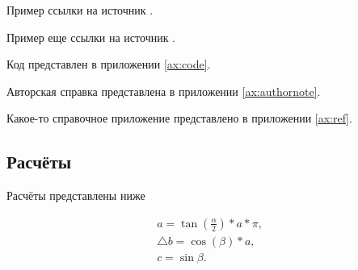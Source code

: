 Пример ссылки на источник .

Пример еще ссылки на источник .

Код представлен в приложении \ref{ax:code}.

Авторская справка представлена в приложении \ref{ax:authornote}.

Какое-то справочное приложение представлено в приложении \ref{ax:ref}.


\subsection{Расчёты}

Расчёты представлены ниже

\begin{gather}
	a = \tan(\frac{\alpha}{2})*a*\pi, \\
	\bigtriangleup b = \cos(\beta)*a, \\
	c = \sin{\beta}.
\end{gather}


\examplecommand
